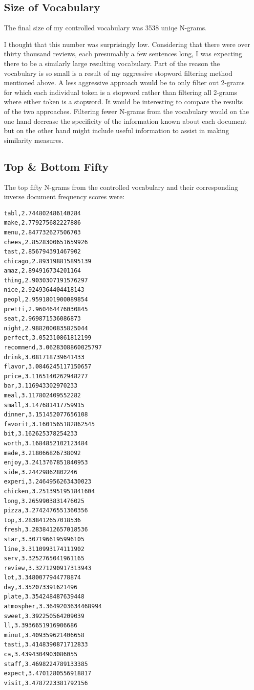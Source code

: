 \documentclass[paper=a4, fontsize=11pt]{jhwhw} %
\begin{document}
\subsection{Size of Vocabulary}
The final size of my controlled vocabulary was 3538 uniqe N-grams. 

I thought that this number was surprisingly low. Considering that there were over thirty thousand reviews, each presumably a few sentences long, I was expecting there to be a similarly large resulting vocabulary. Part of the reason the vocabulary is so small is a result of my aggressive stopword filtering method mentioned above. A less aggressive approach would be to only filter out 2-grams for which each individual token is a stopword rather than filtering all 2-grams where either token is a stopword. It would be interesting to compare the results of the two approaches. Filtering fewer N-grams from the vocabulary would on the one hand decrease the specificity of the information known about each document but on the other hand might include useful information to assist in making similarity measures. 

\subsection{Top \& Bottom Fifty}
The top fifty N-grams from the controlled vocabulary and their corresponding inverse document frequency scores were:
\begin{verbatim}
tabl,2.744802486140284
make,2.779275682227886
menu,2.847732627506703
chees,2.8528300651659926
tast,2.856794391467902
chicago,2.893198815895139
amaz,2.894916734201164
thing,2.9030307191576297
nice,2.9249364404418143
peopl,2.9591801900089854
pretti,2.960464476030845
seat,2.969871536086873
night,2.9882000835825044
perfect,3.052310861812199
recommend,3.0628308860025797
drink,3.081718739641433
flavor,3.0846245117150657
price,3.1165140262948277
bar,3.116943302970233
meal,3.117802409552282
small,3.147681417759915
dinner,3.151452077656108
favorit,3.1601565182862545
bit,3.162625378254233
worth,3.1684852102123484
made,3.218066826738092
enjoy,3.2413767851840953
side,3.24429862802246
experi,3.2464956263430023
chicken,3.2513951951841604
long,3.2659903831476025
pizza,3.2742476551360356
top,3.2838412657018536
fresh,3.2838412657018536
star,3.3071966195996105
line,3.3110993174111902
serv,3.3252765041961165
review,3.3271290917313943
lot,3.3480077944778874
day,3.352073391621496
plate,3.354248487639448
atmospher,3.3649203634468994
sweet,3.392250564209039
ll,3.3936651916906686
minut,3.409359621406658
tasti,3.4148390871712833
ca,3.4394304903086055
staff,3.4698224789133385
expect,3.4701280556918817
visit,3.4787223381792156
\end{verbatim}
\end{document}
